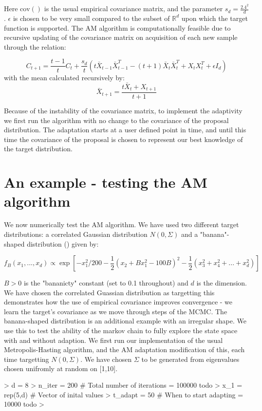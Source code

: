 \documentclass{article}
\begin{document}
Here $\text{cov}()$ is the usual empirical covariance matrix, and the parameter $s_d = \frac{2.4^2}{d}$ \citep{gelman1996}. $\epsilon$ is chosen to be very small compared to the subset of $\mathbb{R}^d$ upon which the target function is supported. The AM algorithm is computationally feasible %
due to recursive updating of the covariance matrix on acquisition of each new sample through the relation:

$$
C_{t+1} = \frac{t-1}{t} C_t + \frac{s_d}{t}(t \bar{X}_{t-1}\bar{X}^T_{t-1} - (t+1)\bar{X}_t \bar{X}^T_t + X_tX_t^T + \epsilon I_d)
$$
 with the mean calculated recursively by:
$$
\bar{X}_{t+1} = \frac{t \bar{X}_{t}  + X_{t+1}}{t+1}
$$

Because of the instability of the covariance matrix, to implement the adaptivity we first run the algorithm with no change to the covariance of the proposal distribution. The adaptation starts at a user defined point in time, and until this time the covariance of the proposal is chosen to represent our best knowledge of the target distribution.

\section{An example - testing the AM algorithm}

We now numerically test the AM algorithm. We have used two different target distributions: a correlated Gaussian distribution $N(0,\Sigma)$ and a "banana"-shaped distribution (\citep{roberts2009}) given by:

$$
f_B\left(x_1,...,x_d\right)\propto \exp \left[ -x_1^2/200 - \frac{1}{2} \left(x_2 + Bx_1^2-100B\right)^2 - \frac{1}{2} \left(x_3^2 + x_4^2 + ... + x_d^2\right) \right]
$$

$B > 0$ is the "bananicty" constant (set to 0.1 throughout) and $d$ is the dimension. We have chosen the correlated Guassian distribution as targetting this demonstrates how the use of empirical covariance improves convergence - we learn the target's covariance as we move through steps of the MCMC. The banana-shaped distribution is an additional example with an irregular shape. We use this to test the ability of the markov chain to fully explore the state space with and without adaption. We first run our implementation of the usual Metropolis-Hasting algorithm, and the AM adaptation modification of this, each time targetting $N(0,\Sigma)$. We have chosen $\Sigma$ to be generated from eigenvalues chosen unifromly at random on [1,10].


\begin{Schunk}
\begin{Sinput}
> d = 8
> n_iter = 200     #  Total number of iterations  = 100000 todo
> x_1 = rep(5,d)      #  Vector of inital values
> t_adapt = 50      #  When to start adapting = 10000 todo
> 
\end{Sinput}
\end{Schunk}
\end{document}
